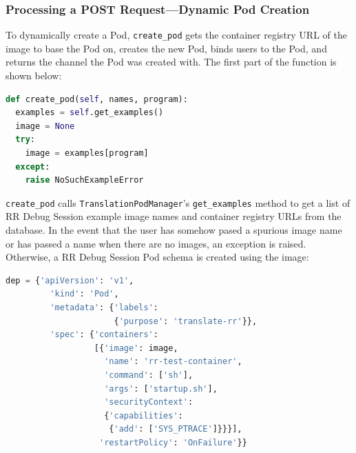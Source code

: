 \documentclass[12pt]{article}
\begin{document}




\subsubsection{Processing a POST Request---Dynamic Pod Creation}

To dynamically create a Pod, \lstinline{create_pod} gets the container
registry URL of the image to base the Pod on, creates the new Pod,
binds users to the Pod, and returns the channel the Pod was created
with.  The first part of the function is shown below:

\begin{lstlisting}[language=Python,basicstyle=\linespread{0.5}\ttfamily,caption={Pod Creation 1},captionpos=b]
def create_pod(self, names, program):
  examples = self.get_examples()
  image = None
  try:
    image = examples[program]
  except:
    raise NoSuchExampleError
\end{lstlisting}

\lstinline{create_pod} calls \lstinline{TranslationPodManager}'s
\lstinline{get_examples} method to get a list of RR Debug Session
example image names and container registry URLs from the database.  In
the event that the user has somehow pased a spurious image name or has
passed a name when there are no images, an exception is raised.
Otherwise, a RR Debug Session Pod schema is created using the image:


\begin{lstlisting}[language=Python,basicstyle=\linespread{0.5}\ttfamily,caption={Pod Creation 2},captionpos=b]
  dep = {'apiVersion': 'v1',
         'kind': 'Pod',
         'metadata': {'labels':
                      {'purpose': 'translate-rr'}},
         'spec': {'containers':
                  [{'image': image,
                    'name': 'rr-test-container',
                    'command': ['sh'],
                    'args': ['startup.sh'],
                    'securityContext':
                    {'capabilities':
                     {'add': ['SYS_PTRACE']}}}],
                   'restartPolicy': 'OnFailure'}}
\end{lstlisting}
\end{document}
